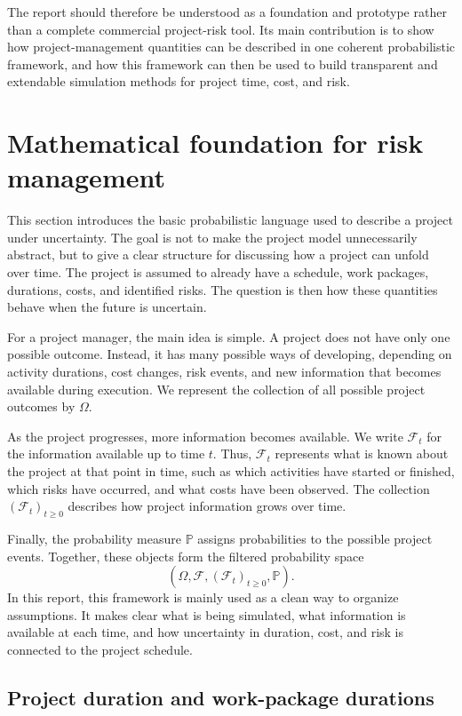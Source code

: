 \documentclass[11pt,a4paper]{article}
\newcommand{\pP}{\mathbb{P}}
\newcommand{\1}{\mathbf{1}}
\theoremstyle{definition}
\theoremstyle{plain}
\theoremstyle{remark}
\numberwithin{equation}{section}
\begin{document}
The report should therefore be understood as a foundation and prototype rather than a complete commercial project-risk tool. Its main contribution is to show how project-management quantities can be described in one coherent probabilistic framework, and how this framework can then be used to build transparent and extendable simulation methods for project time, cost, and risk.

\section{Mathematical foundation for risk management}

This section introduces the basic probabilistic language used to describe a project under uncertainty. The goal is not to make the project model unnecessarily abstract, but to give a clear structure for discussing how a project can unfold over time. The project is assumed to already have a schedule, work packages, durations, costs, and identified risks. The question is then how these quantities behave when the future is uncertain.

For a project manager, the main idea is simple. A project does not have only one possible outcome. Instead, it has many possible ways of developing, depending on activity durations, cost changes, risk events, and new information that becomes available during execution. We represent the collection of all possible project outcomes by $\Omega$.

As the project progresses, more information becomes available. We write $\mathcal{F}_t$ for the information available up to time $t$. Thus, $\mathcal{F}_t$ represents what is known about the project at that point in time, such as which activities have started or finished, which risks have occurred, and what costs have been observed. The collection $(\mathcal{F}_t)_{t\geq 0}$ describes how project information grows over time.

Finally, the probability measure $\pP$ assigns probabilities to the possible project events. Together, these objects form the filtered probability space
\[
(\Omega,\mathcal{F},(\mathcal{F}_t)_{t\geq 0},\pP).
\]
In this report, this framework is mainly used as a clean way to organize assumptions. It makes clear what is being simulated, what information is available at each time, and how uncertainty in duration, cost, and risk is connected to the project schedule.

\subsection{Project duration and work-package durations}
\end{document}
